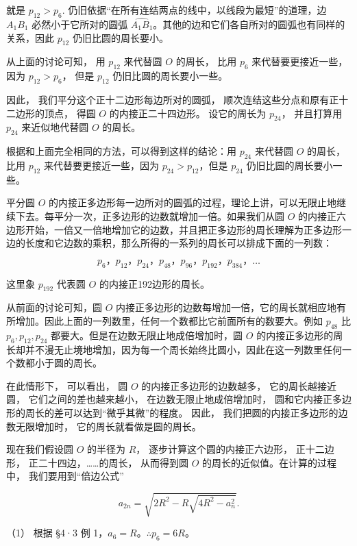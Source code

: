 就是 \(p_{12} > p_6.\)
仍旧依据``在所有连结两点的线中，以线段为最短''的道理，边 \(A_{1}B_{1}\)
必然小于它所对的圆弧
\(\widehat{A_1B_1}\)。其他的边和它们各自所对的圆弧也有同样的关系，因此
\(p_{12}\) 仍旧比圆的周长要小。

从上面的讨论可知， 用 \(p_{12}\) 来代替圆 \(O\) 的周长， 比用 \(p_6\)
来代替要更接近一些， 因为 \(p_{12} > p_6\)， 但是 \(p_{12}\)
仍旧比圆的周长要小一些。

因此， 我们平分这个正十二边形每边所对的圆弧，
顺次连结这些分点和原有正十二边形的顶点， 得圆 \(O\) 的内接正二十四边形。
设它的周长为 \(p_{24}\)， 并且打算用 \(p_{24}\) 来近似地代替圆 \(O\)
的周长。

根据和上面完全相同的方法，可以得到这样的结论：用 \(p_{24}\) 来代替圆
\(O\) 的周长，比用 \(p_{12}\) 来代替要更接近一些，因为
\(p_{24} > p_{12}\)，但是 \(p_{24}\) 仍旧比圆的周长要小一些。

平分圆 \(O\)
的内接正多边形每一边所对的圆弧的过程，理论上讲，可以无限止地继续下去。每平分一次，正多边形的边数就增加一倍。如果我们从圆
\(O\)
的内接正六边形开始，一倍又一倍地增加它的边数，并且把正多边形的周长理解为正多边形一边的长度和它边数的乘积，那么所得的一系列的周长可以排成下面的一列数：

\[
p _ {6}\text{，} p _ {12}\text{，} p _ {24}\text{，} p _ {48}\text{，} p _ {96}\text{，} p _ {192}\text{，} p _ {384}\text{，} \dots \tag {1}
\]

这里象 \(p_{192}\) 代表圆 \(O\) 的内接正192边形的周长。

从前面的讨论可知，圆 \(O\)
内接正多边形的边数每增加一倍，它的周长就相应地有所增加。因此上面的一列数里，任何一个数都比它前面所有的数要大。例如
\(p_{48}\) 比 \(p_6,p_{12},p_{24}\)
都要大。但是在边数无限止地成倍增加时，圆 \(O\)
的内接正多边形的周长却并不漫无止境地增加，因为每一个周长始终比圆小，因此在这一列数里任何一个数都小于圆的周长。

在此情形下， 可以看出， 圆 \(O\) 的内接正多边形的边数越多，
它的周长越接近圆， 它们之间的差也越来越小， 在边数无限止地成倍增加时，
圆和它内接正多边形的周长的差可以达到``微乎其微''的程度。 因此，
我们把圆的内接正多边形的边数无限增加时， 它的周长就看做是圆的周长。

现在我们假设圆 \(O\) 的半径为 \(R\)， 逐步计算这个圆的内接正六边形，
正十二边形， 正二十四边，\ldots\ldots 的周长， 从而得到圆 \(O\)
的周长的近似值。在计算的过程中， 我们要用到``倍边公式''

\[
a _ {2 n} = \sqrt {2 R ^ {2} - R \sqrt {4 R ^ {2} - a _ {n} ^ {2}}}.
\]

（1） 根据 §4·3 例 1，\(a_6=R\)。\(\therefore p_6=6R\)。

